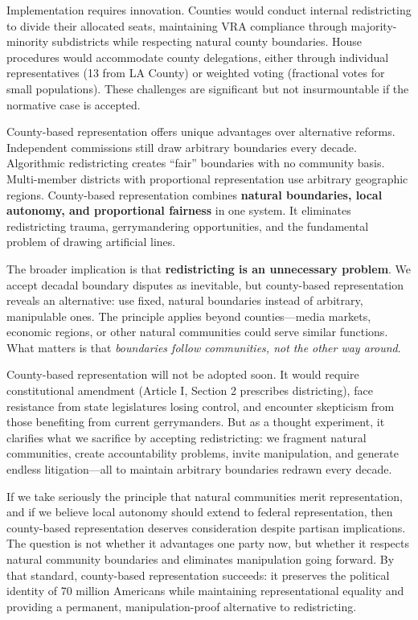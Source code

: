 Implementation requires innovation. Counties would conduct internal redistricting to divide their allocated seats, maintaining VRA compliance through majority-minority subdistricts while respecting natural county boundaries. House procedures would accommodate county delegations, either through individual representatives (13 from LA County) or weighted voting (fractional votes for small populations). These challenges are significant but not insurmountable if the normative case is accepted.

County-based representation offers unique advantages over alternative reforms. Independent commissions still draw arbitrary boundaries every decade. Algorithmic redistricting creates ``fair'' boundaries with no community basis. Multi-member districts with proportional representation use arbitrary geographic regions. County-based representation combines \textbf{natural boundaries, local autonomy, and proportional fairness} in one system. It eliminates redistricting trauma, gerrymandering opportunities, and the fundamental problem of drawing artificial lines.

The broader implication is that \textbf{redistricting is an unnecessary problem}. We accept decadal boundary disputes as inevitable, but county-based representation reveals an alternative: use fixed, natural boundaries instead of arbitrary, manipulable ones. The principle applies beyond counties---media markets, economic regions, or other natural communities could serve similar functions. What matters is that \emph{boundaries follow communities, not the other way around}.

County-based representation will not be adopted soon. It would require constitutional amendment (Article I, Section 2 prescribes districting), face resistance from state legislatures losing control, and encounter skepticism from those benefiting from current gerrymanders. But as a thought experiment, it clarifies what we sacrifice by accepting redistricting: we fragment natural communities, create accountability problems, invite manipulation, and generate endless litigation---all to maintain arbitrary boundaries redrawn every decade.

If we take seriously the principle that natural communities merit representation, and if we believe local autonomy should extend to federal representation, then county-based representation deserves consideration despite partisan implications. The question is not whether it advantages one party now, but whether it respects natural community boundaries and eliminates manipulation going forward. By that standard, county-based representation succeeds: it preserves the political identity of 70 million Americans while maintaining representational equality and providing a permanent, manipulation-proof alternative to redistricting.

